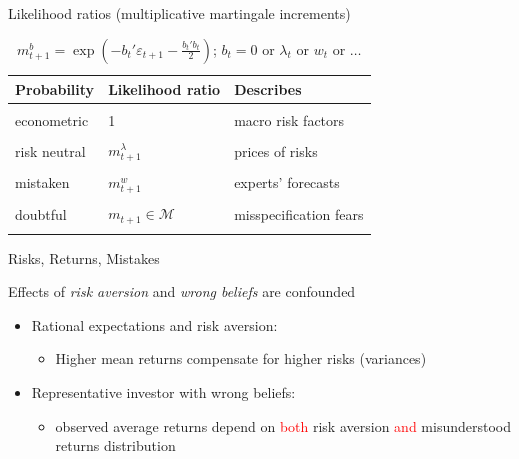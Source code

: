\documentclass{beamer}
\theoremstyle{Definition}
\begin{document}
\begin{frame}{Likelihood ratios (multiplicative martingale increments)}
\begin{table}
\begin{center}
\begin{tabular}{lll}
Probability  & Likelihood ratio & Describes \\ %
\hline\\
econometric  &  1 &  macro risk factors \\
         &  &   \\
risk neutral  & $m_{t+1}^\lambda $ & prices of risks  \\
         & &   \\
mistaken &  $m_{t+1}^w $  & experts'  forecasts  \\
         & &   \\
doubtful & $m_{t+1} \in {\mathcal M} $ & misspecification fears  \\
          & & \\
\end{tabular}
\caption*{ $m_{t+1}^b = \exp\left(-b_t' \varepsilon_{t+1} - \frac{b_t' b_t}{2} \right) $;  $b_t= 0$ or $\lambda_t$ or $w_t$ or $\ldots$}
\end{center}
\end{table}

\end{frame}





\begin{frame}{Risks,  Returns, Mistakes}

 Effects of {\em risk aversion} and {\em wrong beliefs} are confounded

\begin{itemize}

\item Rational expectations and risk aversion: 
\begin{itemize}
\item Higher mean returns compensate for higher risks (variances)   
\end{itemize}
\item Representative investor with wrong beliefs:
\begin{itemize}
 \item observed average returns depend on \textcolor{red}{both}  risk aversion \textcolor{red}{and}   misunderstood returns distribution
 \end{itemize}
\end{itemize}

\end{frame}
\end{document}
